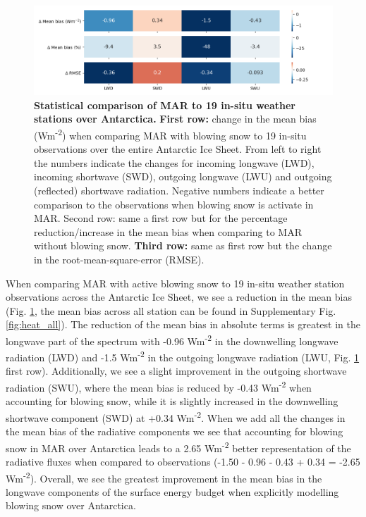 \documentclass[12pt]{article}
\begin{document}
\begin{figure}[H]
	\includegraphics[scale=0.7,center]{heatmap.png}
	\caption{\textbf{Statistical comparison of MAR to 19 in-situ weather stations over Antarctica.} \textbf{First row:} change in the mean bias (Wm\textsuperscript{-2}) when comparing MAR with blowing snow to 19 in-situ observations over the entire Antarctic Ice Sheet. From left to right the numbers indicate the changes for incoming longwave (LWD), incoming shortwave (SWD), outgoing longwave (LWU) and outgoing (reflected) shortwave radiation. Negative numbers indicate a better comparison to the observations when blowing snow is activate in MAR. Second row: same a first row but for the percentage reduction/increase in the mean bias when comparing to MAR without blowing snow. \textbf{Third row:} same as first row but the change in the root-mean-square-error (RMSE).}
	\label{fig:heat}
\end{figure}

When comparing MAR with active blowing snow to 19 in-situ weather station observations across the Antarctic Ice Sheet, we see a reduction in the mean bias (Fig. \ref{fig:heat}, the mean bias across all station can be found in Supplementary Fig. \ref{fig:heat_all}). The reduction of the mean bias in absolute terms is greatest in the longwave part of the spectrum with -0.96 Wm\textsuperscript{-2} in the downwelling longwave radiation (LWD) and -1.5 Wm\textsuperscript{-2} in the outgoing longwave radiation (LWU, Fig. \ref{fig:heat} first row). Additionally, we see a slight improvement in the outgoing shortwave radiation (SWU), where the mean bias is reduced by -0.43 Wm\textsuperscript{-2} when accounting for blowing snow, while it is slightly increased in the downwelling shortwave component (SWD) at +0.34 Wm\textsuperscript{-2}.  When we add all the changes in the mean bias of the radiative components we see that accounting for blowing snow in MAR over Antarctica leads to a 2.65 Wm\textsuperscript{-2} better representation of the radiative fluxes when compared to observations (-1.50 - 0.96 - 0.43 + 0.34 = -2.65 Wm\textsuperscript{-2}). Overall, we see the greatest improvement in the mean bias in the longwave components of the surface energy budget when explicitly modelling blowing snow over Antarctica.
\end{document}
